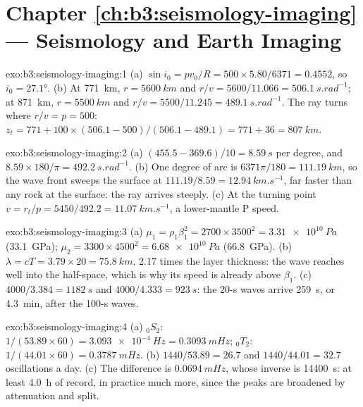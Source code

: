 \section*{Chapter \ref{ch:b3:seismology-imaging} --- Seismology and Earth Imaging}

\begin{solution}{exo:b3:seismology-imaging:1}
(a) $\sin i_0 = pv_0/R = 500\times5.80/6371 = 0.4552$, so $i_0 = \ang{27.1}$.
(b) At \qty{771}{km}, $r = \qty{5600}{km}$ and $r/v = 5600/11.066 =
\qty{506.1}{s.rad^{-1}}$; at \qty{871}{km}, $r = \qty{5500}{km}$ and $r/v =
5500/11.245 = \qty{489.1}{s.rad^{-1}}$. The ray turns where $r/v = p = 500$:
$z_t = 771 + 100\times(506.1 - 500)/(506.1 - 489.1) = 771 + 36 =
\qty{807}{km}$.
\end{solution}

\begin{solution}{exo:b3:seismology-imaging:2}
(a) $(455.5 - 369.6)/10 = \qty{8.59}{s}$ per degree, and
$8.59\times180/\pi = \qty{492.2}{s.rad^{-1}}$. (b) One degree of arc is
$6371\pi/180 = \qty{111.19}{km}$, so the wave front sweeps the surface at
$111.19/8.59 = \qty{12.94}{km.s^{-1}}$, far faster than any rock at the
surface: the ray arrives steeply. (c) At the turning point $v = r_t/p =
5450/492.2 = \qty{11.07}{km.s^{-1}}$, a lower-mantle P speed.
\end{solution}

\begin{solution}{exo:b3:seismology-imaging:3}
(a) $\mu_1 = \rho_1\beta_1^2 = 2700\times3500^2 = \qty{3.31e10}{Pa}$
(\qty{33.1}{GPa}); $\mu_2 = 3300\times4500^2 = \qty{6.68e10}{Pa}$
(\qty{66.8}{GPa}). (b) $\lambda = cT = 3.79\times20 = \qty{75.8}{km}$, 2.17
times the layer thickness: the wave reaches well into the half-space, which is
why its speed is already above $\beta_1$. (c) $4000/3.384 = \qty{1182}{s}$ and
$4000/4.333 = \qty{923}{s}$: the 20-s waves arrive \qty{259}{s}, or
\qty{4.3}{min}, after the 100-s waves.
\end{solution}

\begin{solution}{exo:b3:seismology-imaging:4}
(a) ${}_0S_2$: $1/(53.89\times60) = \qty{3.093e-4}{Hz} = \qty{0.3093}{mHz}$;
${}_0T_2$: $1/(44.01\times60) = \qty{0.3787}{mHz}$. (b) $1440/53.89 = 26.7$
and $1440/44.01 = 32.7$ oscillations a day. (c) The difference is
$\qty{0.0694}{mHz}$, whose inverse is \qty{14400}{s}: at least \qty{4.0}{h} of
record, in practice much more, since the peaks are broadened by attenuation and
split.
\end{solution}

